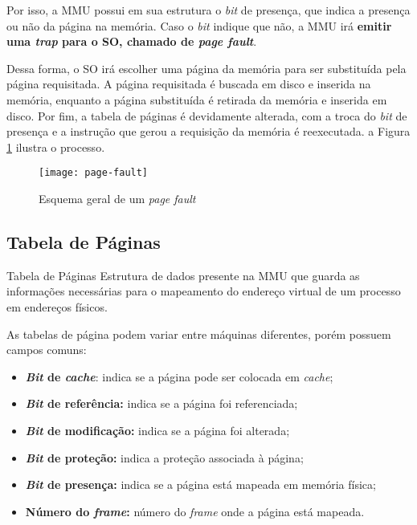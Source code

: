 Por isso, a MMU possui em sua estrutura o \textit{bit} de presença, que indica a presença ou não da página na memória. Caso o \textit{bit} indique que não, a MMU irá \textbf{emitir uma \textit{trap} para o SO, chamado de \textit{page fault}}.

Dessa forma, o SO irá escolher uma página da memória para ser substituída pela página requisitada. A página requisitada é buscada em disco e inserida na memória, enquanto a página substituída é retirada da memória e inserida em disco. Por fim, a tabela de páginas é devidamente alterada, com a troca do \textit{bit} de presença e a instrução que gerou a requisição da memória é reexecutada. a Figura \ref{fig:page-fault} ilustra o processo.

\begin{figure}
  \centering
  \texttt{[image: page-fault]}
  \caption{Esquema geral de um \textit{page fault}}
  \label{fig:page-fault}
\end{figure}











\subsection{Tabela de Páginas}
\begin{definicao}{Tabela de Páginas}
  Estrutura de dados presente na MMU que guarda as informações necessárias para o mapeamento do endereço virtual de um processo em endereços físicos.
\end{definicao}

As tabelas de página podem variar entre máquinas diferentes, porém possuem campos comuns:
\begin{itemize}
  \item \textbf{\textit{Bit} de \textit{cache}}: indica se a página pode ser colocada em \textit{cache};

  \item \textbf{\textit{Bit} de referência:} indica se a página foi referenciada;

  \item \textbf{\textit{Bit} de modificação:} indica se a página foi alterada;

  \item \textbf{\textit{Bit} de proteção:} indica a proteção associada à página;

  \item \textbf{\textit{Bit} de presença:} indica se a página está mapeada em memória física;

  \item \textbf{Número do \textit{frame}:} número do \textit{frame} onde a página está mapeada.
\end{itemize}

